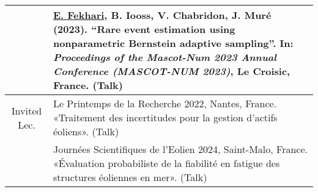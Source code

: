 \begin{center}
\begin{tabularx}{\textwidth}{c X}
                    & \underline{E. Fekhari}, B. Iooss, V. Chabridon, J. Mur\'{e} (2023).
                    ``Rare event estimation using nonparametric Bernstein adaptive sampling''. 
                    In: \textit{Proceedings of the Mascot-Num 2023 Annual Conference (MASCOT-NUM 2023)}, Le Croisic, France. (Talk)\\
        \hline
        Invited Lec.& Le Printemps de la Recherche 2022, Nantes, France. «Traitement des incertitudes pour la gestion d’actifs \'{e}oliens». (Talk)\\

                    & Journ\'{e}es Scientifiques de l’Eolien 2024, Saint-Malo, France. «\'{E}valuation probabiliste de la fiabilit\'{e} en fatigue des structures \'{e}oliennes en mer». (Talk)
                    
        \end{tabularx}    
\end{center}